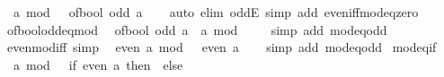 \begin{isabellebody}
\ \ {\isachardoublequoteopen}a\ mod\ {}\ {\isacharequal}{\kern0pt}\ of{\isacharunderscore}{\kern0pt}bool\ {\isacharparenleft}{\kern0pt}odd\ a{\isacharparenright}{\kern0pt}{\isachardoublequoteclose}\isanewline
%
\isadelimproof
\ \ %
\endisadelimproof
%
\isatagproof
{}\isamarkupfalse%
\ {\isacharparenleft}{\kern0pt}auto\ elim{\isacharcolon}{\kern0pt}\ oddE\ simp\ add{\isacharcolon}{\kern0pt}\ even{\isacharunderscore}{\kern0pt}iff{\isacharunderscore}{\kern0pt}mod{\isacharunderscore}{\kern0pt}{}{\isacharunderscore}{\kern0pt}eq{\isacharunderscore}{\kern0pt}zero{\isacharparenright}{\kern0pt}%
\endisatagproof
{\isafoldproof}%
%
\isadelimproof
\isanewline
%
\endisadelimproof
\isanewline
{}\isamarkupfalse%
\ of{\isacharunderscore}{\kern0pt}bool{\isacharunderscore}{\kern0pt}odd{\isacharunderscore}{\kern0pt}eq{\isacharunderscore}{\kern0pt}mod{\isacharunderscore}{\kern0pt}{}{\isacharcolon}{\kern0pt}\isanewline
\ \ {\isachardoublequoteopen}of{\isacharunderscore}{\kern0pt}bool\ {\isacharparenleft}{\kern0pt}odd\ a{\isacharparenright}{\kern0pt}\ {\isacharequal}{\kern0pt}\ a\ mod\ {}{\isachardoublequoteclose}\isanewline
%
\isadelimproof
\ \ %
\endisadelimproof
%
\isatagproof
{}\isamarkupfalse%
\ {\isacharparenleft}{\kern0pt}simp\ add{\isacharcolon}{\kern0pt}\ mod{\isacharunderscore}{\kern0pt}{}{\isacharunderscore}{\kern0pt}eq{\isacharunderscore}{\kern0pt}odd{\isacharparenright}{\kern0pt}%
\endisatagproof
{\isafoldproof}%
%
\isadelimproof
\isanewline
%
\endisadelimproof
\isanewline
{}\isamarkupfalse%
\ even{\isacharunderscore}{\kern0pt}mod{\isacharunderscore}{\kern0pt}{}{\isacharunderscore}{\kern0pt}iff\ {\isacharbrackleft}{\kern0pt}simp{\isacharbrackright}{\kern0pt}{\isacharcolon}{\kern0pt}\isanewline
\ \ {\isacartoucheopen}even\ {\isacharparenleft}{\kern0pt}a\ mod\ {}{\isacharparenright}{\kern0pt}\ {\isasymlongleftrightarrow}\ even\ a{\isacartoucheclose}\isanewline
%
\isadelimproof
\ \ %
\endisadelimproof
%
\isatagproof
{}\isamarkupfalse%
\ {\isacharparenleft}{\kern0pt}simp\ add{\isacharcolon}{\kern0pt}\ mod{\isacharunderscore}{\kern0pt}{}{\isacharunderscore}{\kern0pt}eq{\isacharunderscore}{\kern0pt}odd{\isacharparenright}{\kern0pt}%
\endisatagproof
{\isafoldproof}%
%
\isadelimproof
\isanewline
%
\endisadelimproof
\isanewline
{}\isamarkupfalse%
\ mod{}{\isacharunderscore}{\kern0pt}eq{\isacharunderscore}{\kern0pt}if{\isacharcolon}{\kern0pt}\isanewline
\ \ {\isachardoublequoteopen}a\ mod\ {}\ {\isacharequal}{\kern0pt}\ {\isacharparenleft}{\kern0pt}if\ even\ a\ then\ {}\ else\ {}{\isacharparenright}{\kern0pt}{\isachardoublequoteclose}\isanewline

\end{isabellebody}
